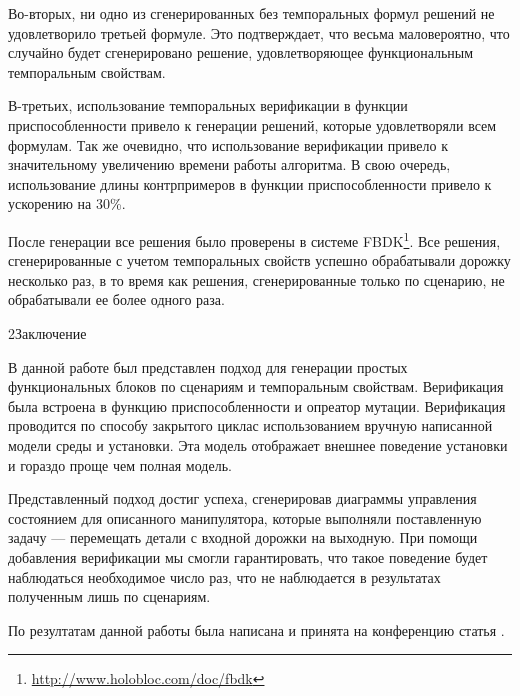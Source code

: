 \documentclass[14pt]{extarticle}
\makeatletter
\theoremstyle{plain}
\theoremstyle{definition}
\renewcommand{\subsection}{\@startsection{subsection}{2}{0mm}%
{2\baselineskip}{\baselineskip}{\bfseries\large\itshape}}
\makeatother
\begin{document}
Во-вторых, ни одно из сгенерированных без темпоральных формул решений не удовлетворило
третьей формуле. Это подтверждает, что весьма маловероятно, что случайно будет
сгенерировано решение, удовлетворяющее функциональным темпоральным свойствам.

В-третьих, использование темпоральных верификации в функции приспособленности привело
к генерации решений, которые удовлетворяли всем формулам. Так же очевидно, что использование
верификации привело к значительному увеличению времени работы алгоритма. В свою очередь,
использование длины контрпримеров в функции приспособленности привело к ускорению на 30\%.

После генерации все решения было проверены в системе FBDK\footnote{\url{http://www.holobloc.com/doc/fbdk}}.
Все решения, сгенерированные с учетом темпоральных свойств успешно обрабатывали дорожку несколько раз,
в то время как решения, сгенерированные только по сценарию, не обрабатывали ее более одного раза.

\subsection{Заключение}

В данной работе был представлен подход для генерации простых функциональных блоков по
сценариям и темпоральным свойствам. Верификация была встроена в функцию приспособленности и
опреатор мутации. Верификация проводится по способу закрытого циклас использованием
вручную написанной модели среды и установки. Эта модель отображает внешнее поведение
установки и гораздо проще чем полная модель.

Представленный подход достиг успеха, сгенерировав диаграммы управления состоянием для
описанного манипулятора, которые выполняли поставленную задачу --- перемещать детали
с входной дорожки на выходную. При помощи добавления верификации мы смогли гарантировать,
что такое поведение будет наблюдаться необходимое число раз, что не наблюдается в
результатах полученным лишь по сценариям.

По резултатам данной работы была написана и принята на конференцию статья \cite{this}.

\pagebreak
\end{document}

